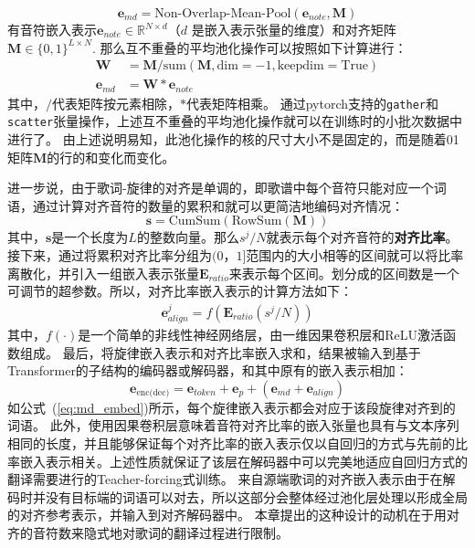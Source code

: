 \begin{equation}
\label{eq:md_embed}
    \mathbf{e}_{md} = \text{Non-Overlap-Mean-Pool}(\mathbf{e}_{note}, \mathbf{M})
\end{equation}
有音符嵌入表示$\mathbf{e}_{note} \in \mathbb{R}^{N \times d}$（$d$ 是嵌入表示张量的维度）和对齐矩阵$\mathbf{M} \in \{0, 1\}^{L \times N}$.
那么互不重叠的平均池化操作可以按照如下计算进行：
\begin{align*}
\mathbf{W} &= \mathbf{M} / \text{sum}(\mathbf{M}, \text{dim}=-1, \text{keepdim}=\text{True}) \\
\mathbf{e}_{md} &= \mathbf{W} * \mathbf{e}_{note}
\end{align*}
其中，$/$代表矩阵按元素相除，$*$代表矩阵相乘。
通过pytorch支持的\texttt{gather}和\texttt{scatter}张量操作，上述互不重叠的平均池化操作就可以在训练时的小批次数据中进行了。
由上述说明易知，此池化操作的核的尺寸大小不是固定的，而是随着01矩阵$\mathbf{M}$的行的和变化而变化。

进一步说，由于歌词-旋律的对齐是单调的，即歌谱中每个音符只能对应一个词语，通过计算对齐音符的数量的累积和就可以更简洁地编码对齐情况：
\begin{equation}
\label{eq:cumsum}
    \mathbf{s} = \text{CumSum}(\text{RowSum}(\mathbf{M}))
\end{equation}
其中，$\mathbf{s}$是一个长度为$L$的整数向量。那么$s^j / N$就表示每个对齐音符的\textbf{对齐比率}。
接下来，通过将累积对齐比率分组为$(0，1]$范围内的大小相等的区间就可以将比率离散化，并引入一组嵌入表示张量$\mathbf{E}_{ratio}$来表示每个区间。划分成的区间数是一个可调节的超参数。所以，对齐比率嵌入表示的计算方法如下：
\begin{align}
\label{eq:align}
    \mathbf{e}_{align}^j = f(\mathbf{E}_{ratio}(s^j / N))
\end{align}
其中，$f(\cdot)$是一个简单的非线性神经网络层，由一维因果卷积层和ReLU激活函数组成。
最后，将旋律嵌入表示和对齐比率嵌入求和，结果被输入到基于Transformer的子结构的编码器或解码器，和其中原有的嵌入表示相加：
\begin{equation}
\label{eq:embed}
    \mathbf{e}_{\text{enc(dec)}} = \mathbf{e}_{token} + \mathbf{e}_p + (\mathbf{e}_{md} + \mathbf{e}_{align})
\end{equation}
如公式~(\ref{eq:md_embed})所示，每个旋律嵌入表示都会对应于该段旋律对齐到的词语。
此外，使用因果卷积层意味着音符对齐比率的嵌入张量也具有与文本序列相同的长度，并且能够保证每个对齐比率的嵌入表示仅以自回归的方式与先前的比率嵌入表示相关。上述性质就保证了该层在解码器中可以完美地适应自回归方式的翻译需要进行的Teacher-forcing式训练。
来自源端歌词的对齐嵌入表示由于在解码时并没有目标端的词语可以对去，所以这部分会整体经过池化层处理以形成全局的对齐参考表示，并输入到对齐解码器中。
本章提出的这种设计的动机在于用对齐的音符数来隐式地对歌词的翻译过程进行限制。

